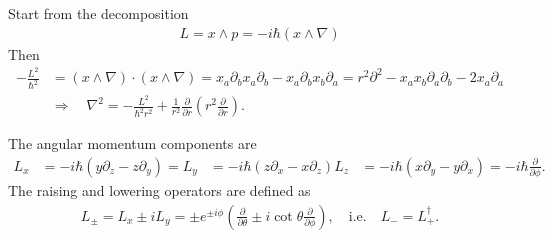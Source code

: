 Start from the decomposition
\begin{align}
    L=x\wedge p = -i\hbar (x \wedge \nabla)
\end{align}
Then
\begin{align}
    -\frac{L^2}{\hbar^2}&= (x\wedge\nabla)\cdot(x\wedge\nabla)= x_a \partial_b x_a\partial_b - x_a \partial_b x_b \partial_a
    = r^2\partial^2 - x_a x_b \partial_a \partial_b - 2 x_a \partial_a \\
    & \Rightarrow \quad \nabla^2 = -\frac{L^2}{\hbar^2 r^2} + \frac{1}{r^2}\frac{\partial}{\partial r}\left(r^2 \frac{\partial}{\partial r}\right).
\end{align}

The angular momentum components are
\begin{align}
    L_x&= -i\hbar (y \partial_z - z \partial_y) =
    L_y&= -i\hbar (z \partial_x - x \partial_z) 
    L_z&= -i\hbar (x \partial_y - y \partial_x) = -i\hbar \frac{\partial}{\partial \phi}.
\end{align}
The raising and lowering operators are defined as
\begin{align}
    L_{\pm} = L_x \pm i L_y = \pm e^{\pm i\phi} \left( \frac{\partial}{\partial \theta} \pm i \cot \theta \frac{\partial}{\partial \phi} \right), \quad \text{i.e.}\quad L_{-}=L_{+}^{\dagger}.
\end{align}



